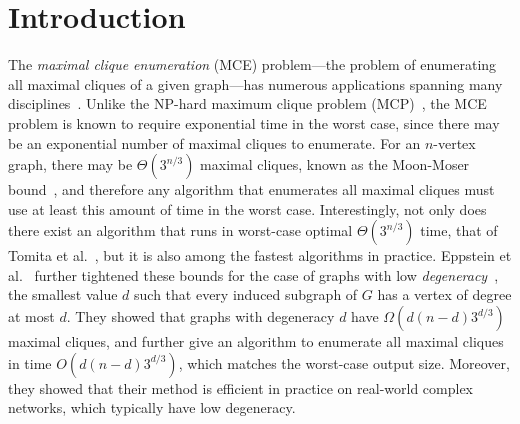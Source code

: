 \documentclass[final,1p]{elsarticle-modified}
\begin{document}
\section{Introduction}
\label{section:introduction}
The \emph{maximal clique enumeration} (MCE) problem---the problem of enumerating all maximal cliques of a given graph---has numerous applications spanning many disciplines~\cite{augustson-1970,gardiner99,HorSko-PAMI-89}. Unlike the NP-hard maximum clique problem (MCP)~\cite{Karp1972,garey-johnson-90}, the MCE problem is known to require exponential time in the worst case, since there may be an exponential number of maximal cliques to enumerate. For an $n$-vertex graph, there may be $\Theta(3^{n/3})$ maximal cliques, known as the Moon-Moser bound~\cite{moon-moser-65}, and therefore any algorithm that enumerates all maximal cliques must use at least this amount of time in the worst case. Interestingly, not only does there exist an algorithm that runs in worst-case optimal $\Theta(3^{n/3})$ time, that of Tomita et al.~\cite{tomita-2006}, but it is also among the fastest algorithms in practice. Eppstein et al.~\cite{els-2013} further tightened these bounds for the case of graphs with low \emph{degeneracy}~\cite{LicWhi-CJM-70}, the smallest value $d$ such that every induced subgraph of $G$ has a vertex of degree at most $d$. They showed that graphs with degeneracy $d$ have $\Omega(d(n-d)3^{d/3})$ maximal cliques, and further give an algorithm to enumerate all maximal cliques in time $O(d(n-d)3^{d/3})$, which matches the worst-case output size. Moreover, they showed that their method is efficient in practice on real-world complex networks, which typically have low degeneracy.


\end{document}
